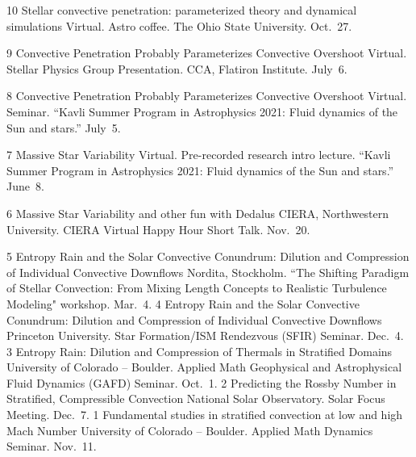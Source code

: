 	  {10}
	  {Stellar convective penetration: parameterized theory and dynamical simulations}
	  {
	  	Virtual. Astro coffee. The Ohio State University. Oct.~27.
	  }

\cvpub{}
	  {9}
	  {Convective Penetration Probably Parameterizes Convective Overshoot}
	  {
	  	Virtual. Stellar Physics Group Presentation. CCA, Flatiron Institute. July~6.
	  }

\cvpub{}
	  {8}
	  {Convective Penetration Probably Parameterizes Convective Overshoot}
	  {
	  	Virtual. Seminar. ``Kavli Summer Program in Astrophysics 2021: Fluid dynamics of the Sun and stars.'' July~5.
	  }


\cvpub{}
	  {7}
	  {Massive Star Variability}
	  {
	  	Virtual. Pre-recorded research intro lecture. ``Kavli Summer Program in Astrophysics 2021: Fluid dynamics of the Sun and stars.'' June~8.
	  }

	  {6}
	  {Massive Star Variability and other fun with Dedalus}
	  {
	  	CIERA, Northwestern University. CIERA Virtual Happy Hour Short Talk. Nov.~20.
	  }

\cvpub{}
	  {5}
	  {Entropy Rain and the Solar Convective Conundrum: Dilution and Compression of Individual Convective Downflows}
	  {
	  	Nordita, Stockholm. ``The Shifting Paradigm of Stellar Convection: From Mixing Length Concepts to Realistic Turbulence Modeling" workshop. Mar.~4.
	  }
	  {4}
	  {Entropy Rain and the Solar Convective Conundrum: Dilution and Compression of Individual Convective Downflows}
	  {
	  	Princeton University. Star Formation/ISM Rendezvous (SFIR) Seminar. Dec.~4.
	  }
\cvpub{}
	  {3}
	  {Entropy Rain: Dilution and Compression of Thermals in Stratified Domains}
	  {
	  	University of Colorado -- Boulder. Applied Math Geophysical and Astrophysical Fluid Dynamics (GAFD) Seminar. Oct.~1.
	  }
	  {2}
	  {Predicting the Rossby Number in Stratified, Compressible Convection}
	  {
	  	National Solar Observatory. Solar Focus Meeting. Dec.~7.
	  }
      {1}
      {Fundamental studies in stratified convection at low and high Mach Number}
      {
        University of Colorado -- Boulder. Applied Math Dynamics Seminar. Nov.~11.
      }
